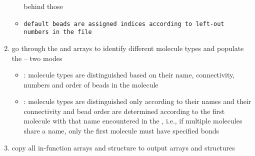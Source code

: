 \begin{enumerate}
\begin{itemize}
        behind those
      \item \tt{default} beads are assigned \vsf indices according to
        left-out numbers in the \vsf file
    \end{itemize}
  \item go through the  and  arrays to identify different
    molecule types and populate the  -- two modes
    \begin{itemize}
      \item {}: molecule types are distinguished based on
        their name, connectivity, numbers and order of beads in the molecule
      \item {}: molecule types are distinguished only
        according to their names and their connectivity and bead order are
        determined according to the first molecule with that name
        encountered in the \vsf, i.e., if multiple molecules share a name,
        only the first molecule must have specified bonds
    \end{itemize}
  \item copy all in-function arrays and structure to output arrays and structures
\end{enumerate} %

